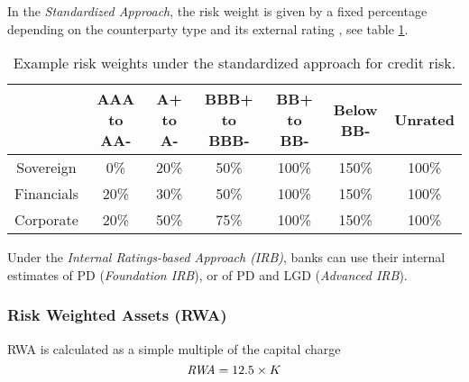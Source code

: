 In the {\em Standardized Approach}, the risk weight is given by a fixed percentage depending on the
counterparty type and its external rating \cite{bcbs128, gregory2020}, see table \ref{tab:standard_weights}.
\begin{table}[hbt]
\scriptsize
\begin{tabular}{|c|c|c|c|c|c|c|}
\hline
 & AAA to AA- & A+ to A- & BBB+ to BBB- & BB+ to BB- & Below BB- & Unrated \\
\hline
\hline
Sovereign & 0\% & 20\% & 50\% & 100\% & 150\% & 100\% \\
Financials & 20\% & 30\% & 50\% & 100\% & 150\% & 100\% \\
Corporate & 20\% & 50\% & 75\% & 100\% & 150\% & 100\% \\
\hline
\end{tabular}
\caption{Example risk weights under the standardized approach for credit risk.}
\label{tab:standard_weights}
\end{table}
Under the {\em Internal Ratings-based Approach (IRB)}, banks can use their internal estimates of PD
({\em Foundation IRB}), or of PD and LGD ({\em Advanced IRB}).


\subsubsection{Risk Weighted Assets (RWA)}

RWA is calculated as a simple multiple of the capital charge 
$$
\mathit{RWA} = 12.5 \times K
$$

